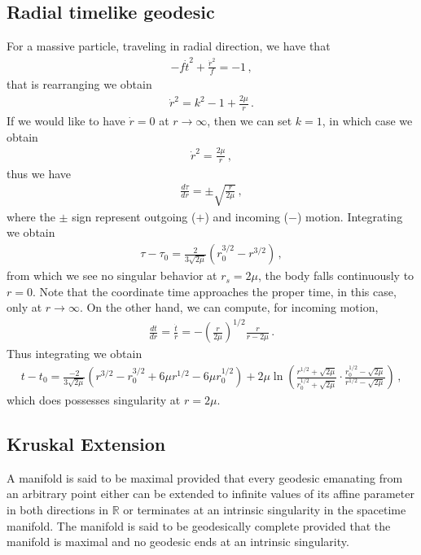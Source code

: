 \documentclass[11pt, onesided]{book}
\theoremstyle{break}
\theoremstyle{break}
\newcommand{\R}{\mathbb{R}}
\begin{document}
\subsection{Radial timelike geodesic}
For a massive particle, traveling in radial direction, we have that
\begin{align*}
-f\dot{t}^2 + \frac{\dot{r}^2}{f} = -1\,, 
\end{align*}
that is rearranging we obtain
\begin{align*}
\dot{r}^2 = k^2 - 1 + \frac{2\mu}{r}\,.
\end{align*}
If we would like to have $\dot{r} = 0$ at $r \to \infty$, then we can set $k = 1$, in which case we obtain
\begin{align*}
\dot{r}^2 = \frac{2\mu}{r}\,, 
\end{align*}
thus we have
\begin{align*}
\frac{d\tau}{dr} = \pm \sqrt{\frac{r}{2\mu}}\,,
\end{align*}
where the $\pm$ sign represent outgoing ($+$) and incoming ($-$) motion. Integrating we obtain
\begin{align*}
\tau - \tau_0 = \frac{2}{3\sqrt{2\mu}}\left( r_0^{3/2} -r^{3/2}\right)\,,
\end{align*}
from which we see no singular behavior at $r_s = 2\mu$, the body falls continuously to $r = 0$. Note that the coordinate time approaches the proper time, in this case, only at $r \to \infty$. On the other hand, we can compute, for incoming motion,
\begin{align*}
\frac{dt}{dr} = \frac{\dot{t}}{\dot{r}} = -\left( \frac{r}{2\mu} \right)^{1/2}\frac{r}{r-2\mu}\,.
\end{align*}
Thus integrating we obtain
\begin{align*}
t -t_0 = \frac{-2}{3\sqrt{2\mu}}\left( r^{3/2} - r_0^{3/2} + 6\mu r^{1/2} - 6\mu r_0^{1/2}\right) + 2\mu\ln\left( \frac{r^{1/2} + \sqrt{2\mu}}{r_0^{1/2}+\sqrt{2\mu}} \cdot \frac{r_0^{1/2} - \sqrt{2\mu}}{r^{1/2}-\sqrt{2\mu}} \right)\,,
\end{align*}
which does possesses singularity at $r = 2\mu$.  \\

\subsection{Kruskal Extension}
A manifold is said to be maximal provided that every geodesic emanating from an arbitrary point either can be extended to infinite values of its affine parameter in both directions in $\R$ or terminates at an intrinsic singularity in the spacetime manifold.  The manifold is said to be geodesically complete provided that the manifold is maximal and no geodesic ends at an intrinsic singularity.\\
\end{document}
